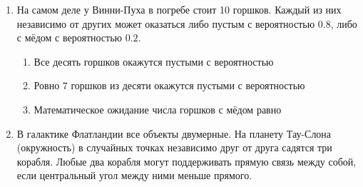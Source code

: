 \documentclass[12pt, a4paper]{article}\usepackage[]{graphicx}\usepackage[]{color}
\begin{document}
\begin{enumerate}
\item На самом деле у Винни-Пуха в погребе стоит 10 горшков. Каждый из них независимо от других может оказаться либо пустым с вероятностью $0.8$, либо с мёдом с вероятностью $0.2$.
\begin{enumerate}
\item Все десять горшков окажутся пустыми с вероятностью \underline{\hspace{2cm}}
\item Ровно $7$ горшков из десяти окажутся пустыми с вероятностью \underline{\hspace{2cm}}
\item Математическое ожидание числа горшков с мёдом равно \underline{\hspace{2cm}}
\end{enumerate}

\item В галактике Флатландии все объекты двумерные. На планету Тау-Слона (окружность) в случайных точках независимо друг от друга садятся три корабля. Любые два корабля могут поддерживать прямую связь между собой, если центральный угол между ними меньше прямого.


\end{enumerate}
\end{document}
